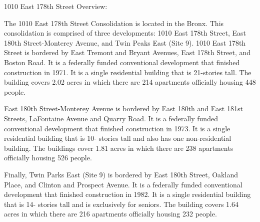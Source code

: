 1010 East 178th Street Overview:      

    

The 1010 East 178th Street Consolidation is located in the Bronx. This consolidation is comprised of three developments: 1010 East 178th Street, East 180th Street-Monterey Avenue, and Twin Peaks East (Site 9). 1010 East 178th Street is bordered by East Tremont and Bryant Avenues, East 178th Street, and Boston Road. It is a federally funded conventional development that finished construction in 1971. It is a single residential building that is 21-stories tall. The building covers 2.02 acres in which there are 214 apartments officially housing 448 people.  



East 180th Street-Monterey Avenue is bordered by East 180th and East 181st Streets, LaFontaine Avenue and Quarry Road. It is a federally funded conventional development that finished construction in 1973. It is a single residential building that is 10- stories tall and also has one non-residential building. The buildings cover 1.81 acres in which there are 238 apartments officially housing 526 people.  



Finally, Twin Parks East (Site 9) is bordered by East 180th Street, Oakland Place, and Clinton and Prospect Avenue. It is a federally funded conventional development that finished construction in 1982. It is a single residential building that is 14- stories tall and is exclusively for seniors. The building covers 1.64 acres in which there are 216 apartments officially housing 232 people.